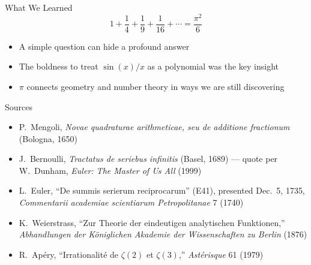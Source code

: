 \documentclass[aspectratio=169]{beamer}
\begin{document}
\begin{frame}{What We Learned}
  \[
    1 + \frac{1}{4} + \frac{1}{9} + \frac{1}{16} + \cdots
    = \frac{\pi^2}{6}
  \]

  \begin{itemize}
    \item A simple question can hide a profound answer
    \item The boldness to treat $\sin(x)/x$ as a polynomial was the
          key insight
    \item $\pi$ connects geometry and number theory in ways we are
          still discovering
  \end{itemize}

\end{frame}

\begin{frame}{Sources}
  \small
  \begin{itemize}
    \item P.\ Mengoli, \emph{Novae quadraturae arithmeticae, seu de
            additione fractionum} (Bologna, 1650)
    \item J.\ Bernoulli, \emph{Tractatus de seriebus infinitis}
          (Basel, 1689) --- quote per W.\ Dunham,
          \emph{Euler: The Master of Us All} (1999)
    \item L.\ Euler, ``De summis serierum reciprocarum'' (E41),
          presented Dec.\ 5, 1735,
          \emph{Commentarii academiae scientiarum Petropolitanae} 7 (1740)
    \item K.\ Weierstrass, ``Zur Theorie der eindeutigen analytischen
          Funktionen,'' \emph{Abhandlungen der K\"oniglichen Akademie der
            Wissenschaften zu Berlin} (1876)
    \item R.\ Ap\'ery, ``Irrationalit\'e de $\zeta(2)$ et $\zeta(3)$,''
          \emph{Ast\'erisque} 61 (1979)
  \end{itemize}
  \nonarration[3]
\end{frame}
\end{document}

